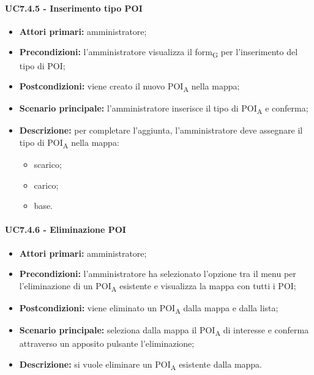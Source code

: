 \paragraph{UC7.4.5 - Inserimento tipo POI}
\begin{itemize}
	\item 	\textbf{Attori primari:} amministratore;
	\item 	\textbf{Precondizioni:} l’amministratore visualizza il \gls{form}\textsubscript{G} per l’inserimento del tipo di POI;
	\item 	\textbf{Postcondizioni:} viene creato il nuovo \acrshort{POI}\textsubscript{A} nella mappa; 
	\item 	\textbf{Scenario principale:} l’amministratore inserisce il tipo di \acrshort{POI}\textsubscript{A} e conferma;
	\item 	\textbf{Descrizione:} per completare l’aggiunta, l’amministratore deve assegnare il tipo di \acrshort{POI}\textsubscript{A} nella mappa:
	\begin{itemize}
		\item scarico;
		\item carico;
		\item base.
	\end{itemize}

\end{itemize}

\paragraph{UC7.4.6 - Eliminazione POI}
\begin{itemize}
	\item 	\textbf{Attori primari:} amministratore;
	\item 	\textbf{Precondizioni:} l’amministratore ha selezionato l’opzione tra il menu per l’eliminazione di un \acrshort{POI}\textsubscript{A} esistente e visualizza la mappa con tutti i POI;
	\item 	\textbf{Postcondizioni:} viene eliminato un \acrshort{POI}\textsubscript{A} dalla mappa e dalla lista; 
	\item 	\textbf{Scenario principale:} seleziona dalla mappa il \acrshort{POI}\textsubscript{A} di interesse e conferma attraverso un apposito pulsante l’eliminazione;
	\item 	\textbf{Descrizione:} si vuole eliminare un \acrshort{POI}\textsubscript{A} esistente dalla mappa.
\end{itemize}
